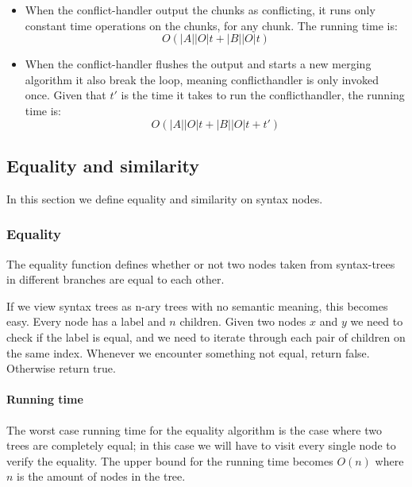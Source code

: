 \documentclass[11pt]{article}
\begin{document}
\begin{itemize}
	\item When the conflict-handler output the chunks as conflicting, it runs only constant time operations on the chunks, for any chunk. The running time is:\\
		\begin{equation}
			O(|A||O| t + |B||O| t) \nonumber
		\end{equation}

	
	\item When the conflict-handler flushes the output and starts a new merging algorithm it also break the loop, meaning conflicthandler is only invoked once. Given that $t'$ is the time it takes to run the conflicthandler, the running time is:\\
		\begin{equation}
			O(|A||O| t + |B||O| t + t') \nonumber
		\end{equation}

\end{itemize}


\subsection{Equality and similarity}
\label{EqSim}
In this section we define equality and similarity on syntax nodes.

\subsubsection{Equality}
The equality function defines whether or not two nodes taken from syntax-trees in different branches are equal to each other.

If we view syntax trees as n-ary trees with no semantic meaning, this becomes easy. Every node has a label and $n$ children. Given two nodes $x$ and $y$ we need to check if the label is equal, and we need to iterate through each pair of children on the same index. Whenever we encounter something not equal, return false. Otherwise return true.

\paragraph{Running time} The worst case running time for the equality algorithm is the case where two trees are completely equal; in this case we will have to visit every single node to verify the equality. The upper bound for the running time becomes $O(n)$ where $n$ is the amount of nodes in the tree.
\end{document}
